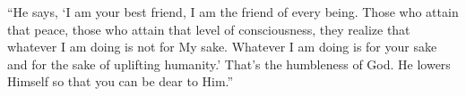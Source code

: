 \enquote{He says, \enquote{I am your best friend, I am the friend of every being. Those who attain that peace, those who attain that level of consciousness, they realize that whatever I am doing is not for My sake. Whatever I am doing is for your sake and for the sake of uplifting humanity.} That’s the humbleness of God. He lowers Himself so that you can be dear to Him.}
